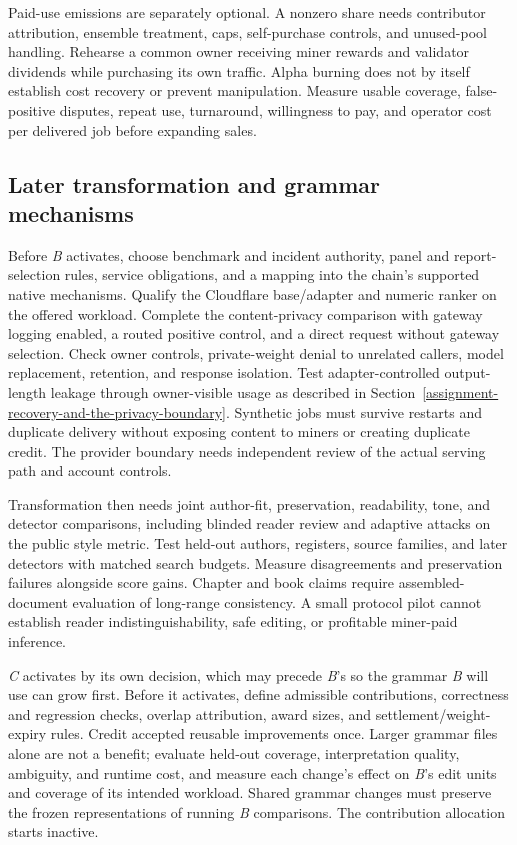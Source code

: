 Paid-use emissions are separately optional. A nonzero share needs contributor
attribution, ensemble treatment, caps, self-purchase controls, and unused-pool
handling. Rehearse a common owner receiving miner rewards and validator
dividends while purchasing its own traffic. Alpha burning does not by itself
establish cost recovery or prevent manipulation. Measure usable coverage,
false-positive disputes, repeat use, turnaround, willingness to pay, and
operator cost per delivered job before expanding sales.

\subsection{Later transformation and grammar mechanisms}

Before \textit{B} activates, choose benchmark and incident authority, panel and
report-selection rules, service obligations, and a mapping into the chain's
supported native mechanisms. Qualify the Cloudflare base/adapter and numeric
ranker on the offered workload. Complete the content-privacy comparison with
gateway logging enabled, a routed positive control, and a direct request without
gateway selection. Check owner controls, private-weight denial to unrelated
callers, model replacement, retention, and response isolation. Test adapter-controlled
output-length leakage through owner-visible usage as described in
Section~\ref{assignment-recovery-and-the-privacy-boundary}. Synthetic jobs
must survive restarts and duplicate delivery without exposing content to miners
or creating duplicate credit. The provider boundary needs independent review
of the actual serving path and account controls.

Transformation then needs joint author-fit, preservation, readability, tone,
and detector comparisons, including blinded reader review and adaptive attacks
on the public style metric. Test held-out authors, registers, source families,
and later detectors with matched search budgets. Measure disagreements and
preservation failures alongside score gains. Chapter and book claims require
assembled-document evaluation of long-range consistency. A small protocol
pilot cannot establish reader indistinguishability, safe editing, or profitable
miner-paid inference.

\textit{C} activates by its own decision, which may precede \textit{B}'s so
the grammar \textit{B} will use can grow first. Before it activates, define admissible contributions, correctness and regression checks,
overlap attribution, award sizes, and settlement/weight-expiry rules. Credit
accepted reusable improvements once. Larger grammar files alone are not a
benefit; evaluate held-out coverage, interpretation quality, ambiguity, and
runtime cost, and measure each change's effect on \textit{B}'s edit units and
coverage of its intended workload. Shared grammar changes must preserve the frozen
representations of running \textit{B} comparisons. The contribution allocation
starts inactive.
